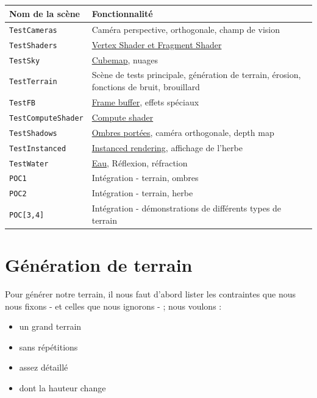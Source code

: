 \documentclass{EPUProjetDi}
\newcommand{\code}{\texttt}
\begin{document}
\paragraph{}
\begin{tabular}{|l|l|}
	\hline
	Nom de la scène & Fonctionnalité \\\hline\hline
	\code{TestCameras} & Caméra perspective, orthogonale, champ de vision\\\hline
	\code{TestShaders} & \hyperref[sec:shaders]{Vertex Shader et Fragment Shader}\\\hline
	\code{TestSky} & \hyperref[sec:sky]{Cubemap}, nuages\\\hline
	\code{TestTerrain} & \makecell[l]{Scène de tests principale, génération de terrain, érosion,\\ fonctions de bruit, brouillard}\\\hline
	\code{TestFB} & \hyperref[sec:framebuffers]{Frame buffer}, effets spéciaux\\\hline
	\code{TestComputeShader} & \hyperref[sec:shaders]{Compute shader}\\\hline
	\code{TestShadows} & \hyperref[sec:casted_shadows]{Ombres portées}, caméra orthogonale, depth map\\\hline
	\code{TestInstanced} & \hyperref[sec:instanced_rendering]{Instanced rendering}, affichage de l'herbe\\\hline
	\code{TestWater} & \hyperref[section:Eau]{Eau}, Réflexion, réfraction\\\hline
	\code{POC1} & Intégration - terrain, ombres\\\hline
	\code{POC2} & Intégration - terrain, herbe\\\hline
	\code{POC[3,4]} & Intégration - démonstrations de différents types de terrain\\\hline
\end{tabular}

\chapter{Génération de terrain}

Pour générer notre terrain, il nous faut d'abord lister les contraintes que nous nous fixons - et celles que nous ignorons - ; nous voulons :
\begin{itemize}
	\item{un grand terrain}
	\item{sans répétitions}
	\item{assez détaillé}
	\item{dont la hauteur change}
\end{itemize}
\end{document}
